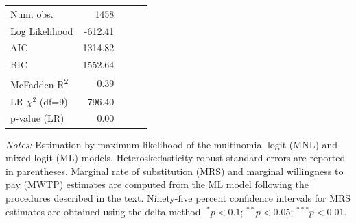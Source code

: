 \begin{table}[!htbp]
\begin{center}
\begin{scriptsize}
\begin{threeparttable}
\begin{tabular}{l D{.}{.}{4.5} D{.}{.}{2.5} c D{.}{.}{3.2}}
\midrule
Num. obs.          & 1458    &             &        &        \\
Log Likelihood     & -612.41 &             &        &        \\
AIC                & 1314.82 &             &        &        \\
BIC                & 1552.64 &             &        &        \\
McFadden R\textsuperscript{2} & 0.39    &             &        &        \\
LR $\chi^{2}$ (df=9)          & 796.40  &             &        &        \\
p-value (LR)       & 0.00    &             &        &        \\
\bottomrule

\end{tabular}

\begin{tablenotes}
\scriptsize
\item \textit{Notes:} Estimation by maximum likelihood of the multinomial logit (MNL) and mixed logit (ML) models. 
Heteroskedasticity-robust standard errors are reported in parentheses. 
Marginal rate of substitution (MRS) and marginal willingness to pay (MWTP) estimates are computed from the ML model following the procedures described in the text. 
Ninety-five percent confidence intervals for MRS estimates are obtained using the delta method. 
$^{*}p < 0.1$; $^{**}p < 0.05$; $^{***}p < 0.01$.
\end{tablenotes}

\end{threeparttable}
\end{scriptsize}
\label{tab:base_renter}
\end{center}
\end{table}
